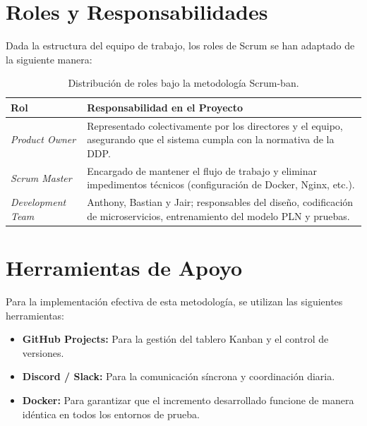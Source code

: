 \section{Roles y Responsabilidades}
Dada la estructura del equipo de trabajo, los roles de Scrum se han adaptado de la siguiente manera:
\begin{table}[htbp]
\centering
\small
\begin{tabular}{|l|p{9cm}|}
\hline
\textbf{Rol} & \textbf{Responsabilidad en el Proyecto} \\ \hline
\textit{Product Owner} & Representado colectivamente por los directores y el equipo, asegurando que el sistema cumpla con la normativa de la DDP. \\ \hline
\textit{Scrum Master} & Encargado de mantener el flujo de trabajo y eliminar impedimentos técnicos (configuración de Docker, Nginx, etc.). \\ \hline
\textit{Development Team} & Anthony, Bastian y Jair; responsables del diseño, codificación de microservicios, entrenamiento del modelo PLN y pruebas. \\ \hline
\end{tabular}
\caption{Distribución de roles bajo la metodología Scrum-ban.}
\end{table}

\section{Herramientas de Apoyo}
Para la implementación efectiva de esta metodología, se utilizan las siguientes herramientas:
\begin{itemize}
    \item \textbf{GitHub Projects:} Para la gestión del tablero Kanban y el control de versiones.
    \item \textbf{Discord / Slack:} Para la comunicación síncrona y coordinación diaria.
    \item \textbf{Docker:} Para garantizar que el incremento desarrollado funcione de manera idéntica en todos los entornos de prueba.
\end{itemize}
